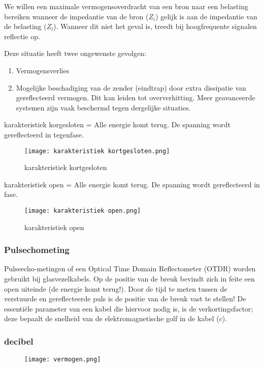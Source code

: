 We willen een maximale vermogensoverdracht van een bron naar een belasting bereiken wanneer de impedantie van de bron (\(Z_i\)) gelijk is aan de impedantie van de belasting (\(Z_l\)). Wanneer dit niet het geval is, treedt bij hoogfrequente signalen reflectie op.

Deze situatie heeft twee ongewenste gevolgen:
\begin{enumerate}
  \item Vermogensverlies
  \item Mogelijke beschadiging van de zender (eindtrap) door extra dissipatie van gereflecteerd vermogen. Dit kan leiden tot oververhitting. Meer geavanceerde systemen zijn vaak beschermd tegen dergelijke situaties.
\end{enumerate}

karakteristiek korgesloten = Alle energie komt terug. De spanning wordt gereflecteerd in tegenfase.
\begin{figure}[H]
\centering
\texttt{[image: karakteristiek kortgesloten.png]}
\caption{karakteristiek kortgesloten}
\end{figure}

karakteristiek open = Alle energie komt terug. De spanning wordt gereflecteerd in fase.
\begin{figure}[H]
\centering
\texttt{[image: karakteristiek open.png]}
\caption{karakteristiek open}
\end{figure}

\subsubsection{Pulsechometing}

Pulseecho-metingen of een Optical Time Domain Reflectometer (OTDR) worden gebruikt bij glasvezelkabels. Op de positie van de breuk bevindt zich in feite een open uiteinde (de energie komt terug!). Door de tijd te meten tussen de verstuurde en gereflecteerde puls is de positie van de breuk vast te stellen! De essentiële parameter van een kabel die hiervoor nodig is, is de verkortingsfactor; deze bepaalt de snelheid van de elektromagnetische golf in de kabel (\(c\)).

\subsubsection{decibel}
\begin{figure}[H]
\centering
\texttt{[image: vermogen.png]}
\end{figure}

